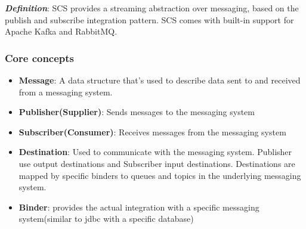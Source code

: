 \documentclass[a4paper, 12pt]{article}
\begin{document}
    \textit{\textbf{Definition}}: SCS provides a streaming abstraction over messaging, based on the publish and subscribe integration pattern. SCS comes with built-in support for Apache Kafka and RabbitMQ.

    \subsubsection{Core concepts}

    \begin{itemize}
        \item \textbf{Message}: A data structure that's used to describe data sent to and received from a messaging system.
        \item \textbf{Publisher(Supplier)}: Sends messages to the messaging system
        \item \textbf{Subscriber(Consumer)}: Receives messages from the messaging system
        \item \textbf{Destination}: Used to communicate with the messaging system.
        Publisher use output destinations and Subscriber input destinations.
        Destinations are mapped by specific binders to queues and topics in the underlying messaging system.
        \item \textbf{Binder}: provides the actual integration with a specific messaging system(similar to jdbc with a specific database)
    \end{itemize}
\end{document}
